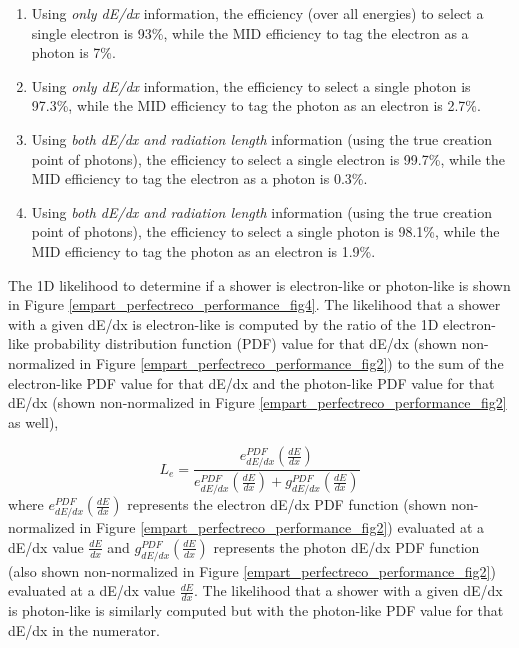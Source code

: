 \begin{enumerate}
\item Using \textit{only dE/dx} information, the efficiency (over all energies) to select a single electron is 93\%, while the MID efficiency to tag the electron as a photon is 7\%. 
\item Using \textit{only dE/dx} information, the efficiency to select a single photon is 97.3\%, while the MID efficiency to tag the photon as an electron is 2.7\%.
\item Using \textit{both dE/dx and radiation length} information (using the true creation point of photons), the efficiency to select a single electron is 99.7\%, while the MID efficiency to tag the electron as a photon is 0.3\%. 
\item Using \textit{both dE/dx and radiation length} information (using the true creation point of photons), the efficiency to select a single photon is 98.1\%, while the MID efficiency to tag the photon as an electron is 1.9\%.
\end{enumerate}


The 1D likelihood to determine if a shower is electron-like or photon-like is shown in Figure \ref{empart_perfectreco_performance_fig4}. The likelihood that a shower with a given dE/dx is electron-like is computed by the ratio of the 1D electron-like probability distribution function (PDF) value for that dE/dx (shown non-normalized in Figure \ref{empart_perfectreco_performance_fig2}) to the sum of the electron-like PDF value for that dE/dx and the photon-like PDF value for that dE/dx (shown non-normalized in Figure \ref{empart_perfectreco_performance_fig2} as well),

\begin{equation}\label{1D_dedx_likelihood_eqtn}
L_e=\frac{e_{dE/dx}^{PDF}(\frac{dE}{dx})}{ e_{dE/dx}^{PDF}(\frac{dE}{dx}) + g_{dE/dx}^{PDF}(\frac{dE}{dx}) }
\end{equation}
where $e_{dE/dx}^{PDF}(\frac{dE}{dx})$ represents the electron dE/dx PDF function (shown non-normalized in Figure \ref{empart_perfectreco_performance_fig2}) evaluated at a dE/dx value $\frac{dE}{dx}$ and $g_{dE/dx}^{PDF}(\frac{dE}{dx})$ represents the photon dE/dx PDF function (also shown non-normalized in Figure \ref{empart_perfectreco_performance_fig2}) evaluated at a dE/dx value $\frac{dE}{dx}$. The likelihood that a shower with a given dE/dx is photon-like is similarly computed but with the photon-like PDF value for that dE/dx in the numerator.\\

